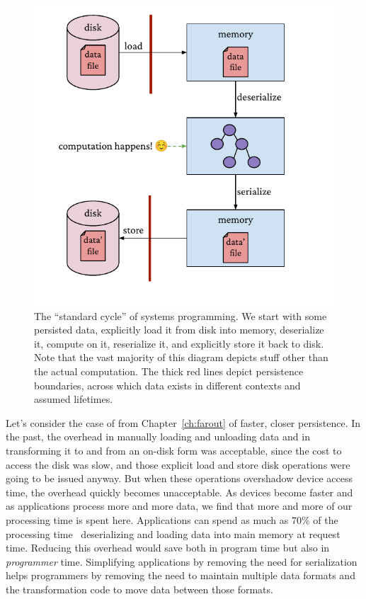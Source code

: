 \begin{figure}
    \centering
    \includegraphics[width=\linewidth]{fig/cycle.pdf}
    \caption[The cycle of systems programming]{The ``standard cycle'' of systems programming. We start with some persisted data, explicitly load it from disk into memory, deserialize it, compute on it, reserialize it, and explicitly store it back to disk. Note that the vast majority of this diagram depicts stuff other than the actual computation. The thick red lines depict persistence boundaries, across which data exists in different contexts and assumed lifetimes.}
    \label{fig:cycle}
\end{figure}

Let's consider the case of from Chapter~\ref{ch:farout} of faster, closer persistence.
In the past, the overhead in manually loading and unloading
data and in transforming it to and from an on-disk form was acceptable, since the cost to access the disk was slow,
and those explicit load and store disk operations were going to be issued anyway. But when these operations overshadow
device access time, the overhead quickly becomes unacceptable. As devices become faster and as applications process more
and more data, we find that more and more of our processing time is spent here. Applications can spend as much as 70\% of the processing
time~\cite{trims} deserializing and loading data into main memory at request time. Reducing this overhead would save
both in program time but also in \emph{programmer} time. Simplifying applications by removing the need for serialization
helps programmers by removing the need to maintain multiple data formats and the transformation code to move data
between those formats.

